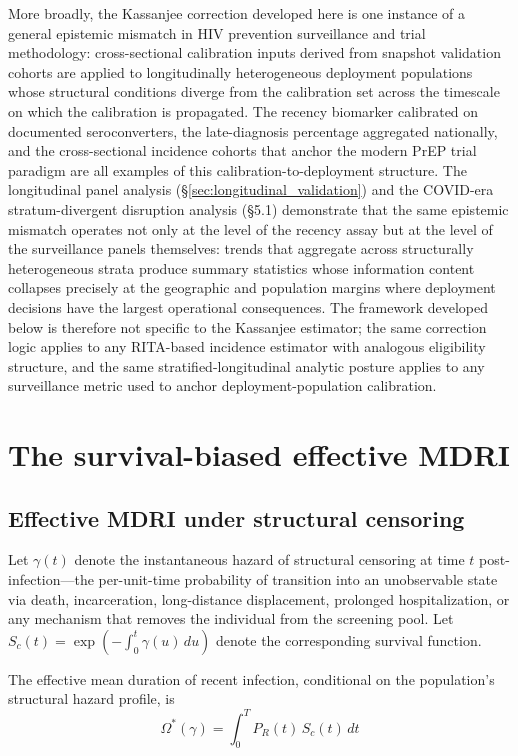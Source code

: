 \documentclass[12pt]{article}
\begin{document}
More broadly, the Kassanjee correction developed here is one instance of a general epistemic mismatch in HIV prevention surveillance and trial methodology: cross-sectional calibration inputs derived from snapshot validation cohorts are applied to longitudinally heterogeneous deployment populations whose structural conditions diverge from the calibration set across the timescale on which the calibration is propagated. The recency biomarker calibrated on documented seroconverters, the late-diagnosis percentage aggregated nationally, and the cross-sectional incidence cohorts that anchor the modern PrEP trial paradigm are all examples of this calibration-to-deployment structure. The longitudinal panel analysis (§\ref{sec:longitudinal_validation}) and the COVID-era stratum-divergent disruption analysis (§5.1) demonstrate that the same epistemic mismatch operates not only at the level of the recency assay but at the level of the surveillance panels themselves: trends that aggregate across structurally heterogeneous strata produce summary statistics whose information content collapses precisely at the geographic and population margins where deployment decisions have the largest operational consequences. The framework developed below is therefore not specific to the Kassanjee estimator; the same correction logic applies to any RITA-based incidence estimator with analogous eligibility structure, and the same stratified-longitudinal analytic posture applies to any surveillance metric used to anchor deployment-population calibration.

\section{The survival-biased effective MDRI}

\subsection{Effective MDRI under structural censoring}

Let $\gamma(t)$ denote the instantaneous hazard of structural censoring at time $t$ post-infection---the per-unit-time probability of transition into an unobservable state via death, incarceration, long-distance displacement, prolonged hospitalization, or any mechanism that removes the individual from the screening pool. Let $S_c(t) = \exp\left(-\int_0^t \gamma(u)\, du\right)$ denote the corresponding survival function.

The effective mean duration of recent infection, conditional on the population's structural hazard profile, is
\begin{equation}
\Omega^*(\gamma) = \int_0^T P_R(t)\, S_c(t)\, dt
\end{equation}
\end{document}
